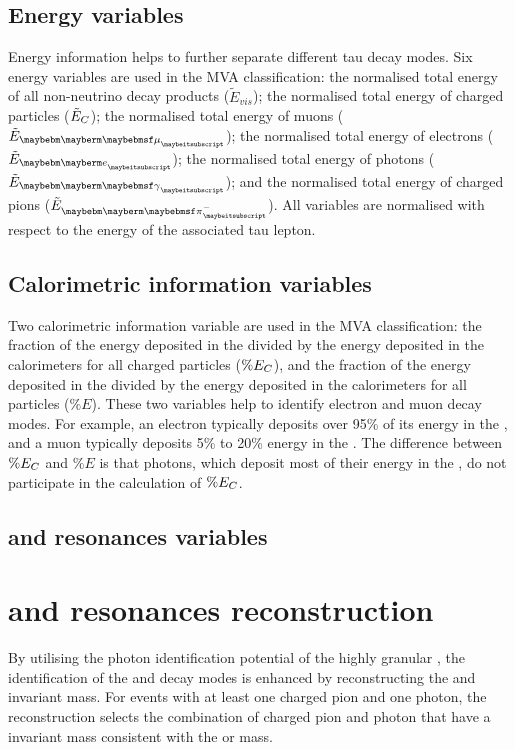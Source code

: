 \subsection{Energy variables}

Energy information helps to further separate different tau decay modes. Six energy variables are used in the MVA classification: the normalised total energy of all non-neutrino decay products ($\tilde{E}_{vis}$); the normalised total energy of charged particles ($\tilde{E}_{C}$); the normalised total energy of muons ($\tilde{E}_{\Pmu}$); the normalised total energy of electrons ($\tilde{E}_{\Pe}$); the normalised total energy of photons ($\tilde{E}_{\Pgg}$); and the normalised total energy of charged pions ($\tilde{E}_{\Pgpm}$). All variables are normalised with respect to the energy of the associated tau lepton.

\subsection{Calorimetric information variables}


Two calorimetric information variable are used in the MVA classification: the fraction of the energy  deposited in the \ECAL divided by the  energy deposited in the calorimeters for all charged particles ($\% E_{C}$), and the fraction of the energy  deposited in the \ECAL divided by the  energy deposited in the calorimeters for all particles ($\% E$). These  two variables help to identify electron and muon decay modes. For example, an electron typically deposits over 95\% of its energy in the \ECAL, and a muon typically deposits 5\% to 20\% energy in the \ECAL. The difference between $\% E_{C}$ and  $\% E$ is that photons, which deposit most of their energy in the \ECAL, do not participate in the calculation of $\% E_{C}$.

\subsection{\texorpdfstring{\decayRhoShort and \decayAiPhotonShort} \, resonances variables}


\section{\texorpdfstring{\decayRhoShort and \decayAiPhotonShort} \, resonances reconstruction}
\label{sec:tauResonance}

By utilising the photon identification potential of the highly granular \ECAL, the identification of the \decayRhoShort and \decayAiPhotonShort decay modes is enhanced  by reconstructing the \Prho and \Pai invariant mass. For events with at least one charged pion and one photon, the reconstruction selects the combination of charged pion and photon that have a invariant mass consistent with the \Prho or \Pai mass.



